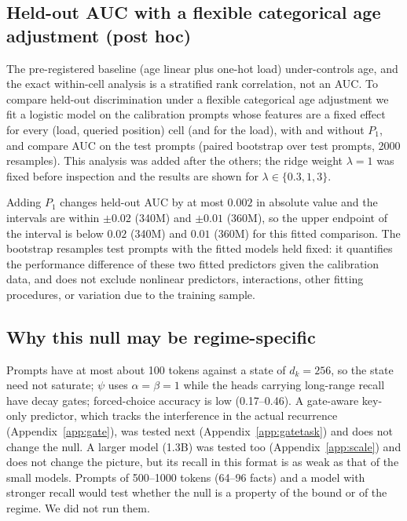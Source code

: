 \subsection{Held-out AUC with a flexible categorical age adjustment (post hoc)}
The pre-registered baseline (age linear plus one-hot load) under-controls age, and the exact within-cell analysis is a stratified rank correlation, not an AUC. To compare held-out discrimination under a flexible categorical age adjustment we fit a logistic model on the calibration prompts whose features are a fixed effect for every (load, queried position) cell (and for the load), with and without $P_1$, and compare AUC on the test prompts (paired bootstrap over test prompts, 2000 resamples). This analysis was added after the others; the ridge weight $\lambda=1$ was fixed before inspection and the results are shown for $\lambda\in\{0.3,1,3\}$.
\begin{table}[!htbp]
  \caption{Held-out AUC with a flexible categorical age adjustment (cell fixed effects), without and with $P_1$.}\label{tab:flexauc}
  \centering\small\setlength{\tabcolsep}{4pt}
  
\end{table}
Adding $P_1$ changes held-out AUC by at most $0.002$ in absolute value and the intervals are within $\pm0.02$ (340M) and $\pm0.01$ (360M), so the upper endpoint of the interval is below $0.02$ (340M) and $0.01$ (360M) for this fitted comparison. The bootstrap resamples test prompts with the fitted models held fixed: it quantifies the performance difference of these two fitted predictors given the calibration data, and does not exclude nonlinear predictors, interactions, other fitting procedures, or variation due to the training sample.

\subsection{Why this null may be regime-specific}
Prompts have at most about 100 tokens against a state of $d_k=256$, so the state need not saturate; $\psi$ uses $\alpha=\beta=1$ while the heads carrying long-range recall have decay gates; forced-choice accuracy is low (0.17--0.46). A gate-aware key-only predictor, which tracks the interference in the actual recurrence (Appendix~\ref{app:gate}), was tested next (Appendix~\ref{app:gatetask}) and does not change the null. A larger model (1.3B) was tested too (Appendix~\ref{app:scale}) and does not change the picture, but its recall in this format is as weak as that of the small models. Prompts of 500--1000 tokens (64--96 facts) and a model with stronger recall would test whether the null is a property of the bound or of the regime. We did not run them.

